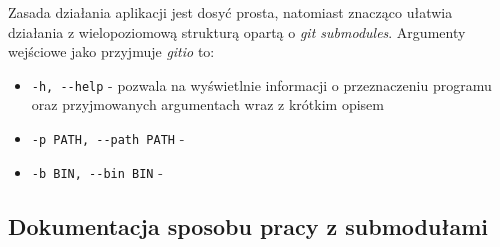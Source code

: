 Zasada działania aplikacji jest dosyć prosta, natomiast znacząco ułatwia działania z wielopoziomową strukturą opartą o \emph{git submodules}. Argumenty wejściowe jako przyjmuje \emph{gitio} to:
\begin{itemize}
    \item \lstinline{-h, --help} - pozwala na wyświetlnie informacji o przeznaczeniu programu oraz przyjmowanych argumentach wraz z krótkim opisem
    \item \lstinline{-p PATH, --path PATH} -
    \item \lstinline{-b BIN, --bin BIN} -
\end{itemize}

\subsection{Dokumentacja sposobu pracy z submodułami}

